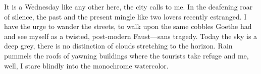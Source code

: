 \documentclass[
]{article}
\begin{document}
It is a Wednesday like any other here, the city calls to me. In the
deafening roar of silence, the past and the present mingle like two
lovers recently estranged. I have the urge to wander the streets, to
walk upon the same cobbles Goethe had and see myself as a twisted,
post-modern Faust---sans tragedy. Today the sky is a deep grey, there is
no distinction of clouds stretching to the horizon. Rain pummels the
roofs of yawning buildings where the tourists take refuge and me, well,
I stare blindly into the monochrome watercolor.
\end{document}
